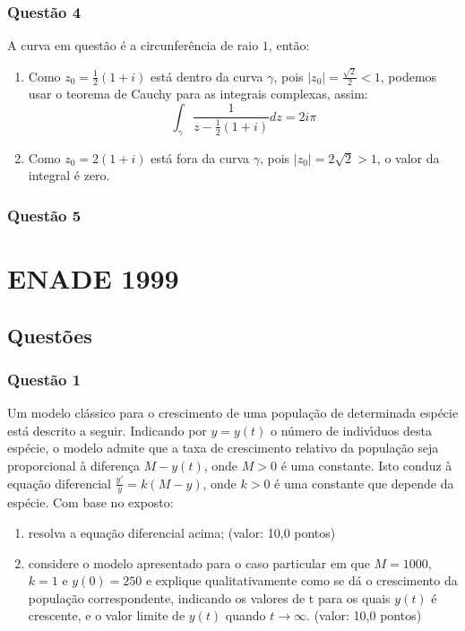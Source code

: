 \documentclass{report}
\begin{document}
\subsection{\color{red} Quest\~ao 4}

A curva em quest\~ao \'e a circunfer\^encia de raio $1$, ent\~ao:

\begin{enumerate}

\item[(a)] Como $z_0=\frac1{2}(1+i)$ est\'a dentro da curva $\gamma$, pois $|z_0|=\frac{\sqrt 2}{2}<1$, podemos usar o teorema de Cauchy para as integrais complexas, assim: $$\displaystyle \int_\gamma \frac1{z-\frac1{2}(1+i)} dz=2i\pi$$

\item[(b)] Como $z_0=2(1+i)$ est\'a fora da curva $\gamma$, pois $|z_0|=2\sqrt 2 > 1$, o valor da integral \'e zero.

\end{enumerate}

\subsection{\color{red} Quest\~ao 5}

\chapter{ENADE 1999}

\section{\color{blue} Quest\~oes}

\subsection{\color{blue} Quest\~ao 1}

Um modelo cl\'assico para o crescimento de uma popula\c c\~ao de determinada esp\'ecie est\'a descrito a seguir. Indicando por
$y = y(t)$ o n\'umero de indiv\'\i duos desta esp\'ecie, o modelo admite que a taxa de crescimento relativo da popula\c c\~ao seja proporcional
\`a diferen\c ca $M - y(t)$, onde $M > 0$ \'e uma constante. Isto conduz \`a equa\c c\~ao diferencial $\displaystyle \frac{y'}{y}= k (M - y)$, onde $k > 0$ \'e uma constante que depende da esp\'ecie. Com base no exposto:

\begin{enumerate}

\item[(a)] resolva a equa\c c\~ao diferencial acima; (valor: 10,0 pontos)

\item[(b)] considere o modelo apresentado para o caso particular em que $M = 1000$, $k = 1$ e $y (0) = 250$ e explique qualitativamente como se d\'a o crescimento da popula\c c\~ao correspondente, indicando os valores de t para os quais $y(t)$ \'e crescente, e o valor limite de $y(t)$ quando $t \to \infty$. (valor: 10,0 pontos)

\end{enumerate}
\end{document}
